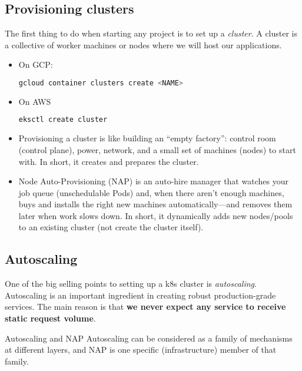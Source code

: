 \subsection{Provisioning clusters}

The first thing to do when starting any project is to set up a \textit{cluster}. A cluster is a collective of worker machines or nodes where we will host our applications. 

\begin{itemize}
	\item On GCP: 
\begin{lstlisting}[language=bash]
gcloud container clusters create <NAME>
\end{lstlisting}
	\item On AWS
\begin{lstlisting}[language=bash]
eksctl create cluster
\end{lstlisting}
\end{itemize}


\begin{itemize}
	\item Provisioning a cluster is like building an ``empty factory'': control room (control plane), power, network, and a small set of machines (nodes) to start with. In short, it creates and prepares the cluster.
	\item Node Auto-Provisioning (NAP) is an auto-hire manager that watches your job queue (unschedulable Pods) and, when there aren't enough machines, buys and installs the right new machines automatically—and removes them later when work slows down. In short, it dynamically adds new nodes/pools to an existing cluster (not create the cluster itself).
\end{itemize}

\subsection{Autoscaling}

One of the big selling points to setting up a k8s cluster is \textit{autoscaling}. Autoscaling is an important ingredient in creating robust production-grade services. The main reason is that \textbf{we never expect any service to receive static request volume}.

\begin{commentbox}{Autoscaling and NAP}
	Autoscaling can be considered as a family of mechanisms at different layers, and NAP is one specific (infrastructure) member of that family.
\end{commentbox}

